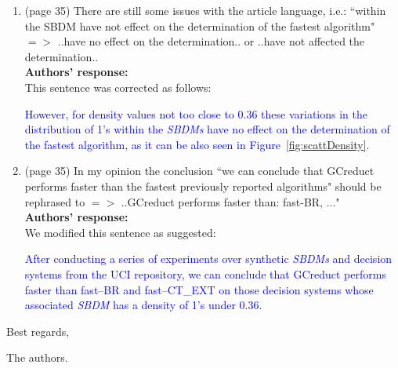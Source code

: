 \documentclass{letter}
\newtheorem{definition}{Definition}
\begin{document}
\begin{letter}{}
\begin{enumerate}
	\begin{definition}\label{def:basic_row}
		\textcolor{blue}{Let $DM$ be a binary discernibility matrix and $r_k \in DM$ be a row of $DM$. We say that $r_k$ is a superfluous row of $DM$ if $\exists r \in DM$ such that $\exists i | (r[i] < r_k[i]) \wedge \forall i | (r[i] \leq r_k[i])$, where $r[i]$ is the $i$-th element of the row $r$.}	
	\end{definition}	 
	
	\item (page 35) There are still some issues with the article language, i.e.: ``within the SBDM have not effect on the determination of the fastest algorithm" $=>$ ..have no effect on the determination.. or ..have not affected the determination..\\
	\textbf{Authors’ response:}\\
	This sentence was corrected as follows:
	
	\textcolor{blue}{However, for density values not too close to 0.36 these variations in the distribution of 1's within the \textit{SBDMs} have no effect on the determination of the fastest algorithm, as it can be also seen in Figure~\ref{fig:scattDensity}.}
	
	\item (page 35) In my opinion the conclusion ``we can conclude that GCreduct performs faster than the fastest previously reported algorithms" should be rephrased to $=>$  ..GCreduct performs faster than: fast-BR, ..."\\
	\textbf{Authors’ response:}\\
	We modified this sentence as suggested:
	
	\textcolor{blue}{After conducting a series of experiments over synthetic \textit{SBDMs} and decision systems from the UCI repository, we can conclude that GCreduct performs faster than fast--BR and fast--CT\_EXT on those decision systems whose associated \textit{SBDM} has a density of 1's under 0.36.}
	
  \end{enumerate}     
  
  Best regards,

  The authors.
  
\end{letter}
\end{document}
